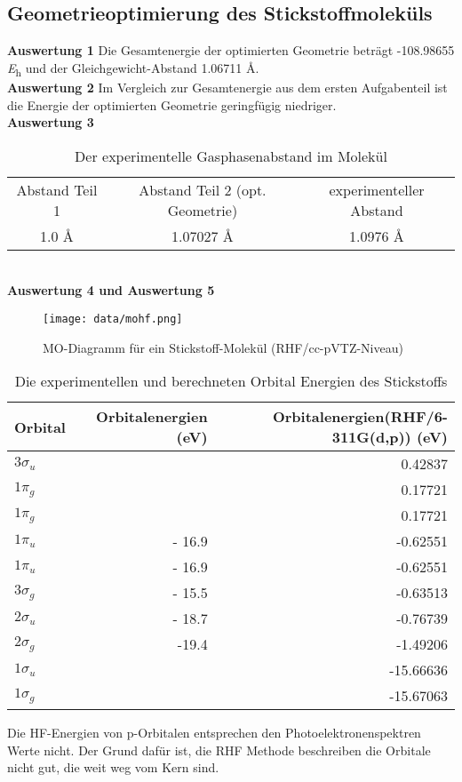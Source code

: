 \documentclass[12pt]{article}
\begin{document}
\begin{onehalfspace}
\subsection{Geometrieoptimierung des Stickstoffmoleküls}
\textbf{Auswertung 1}
Die Gesamtenergie der optimierten Geometrie beträgt -108.98655 \si{\hartree} und der Gleichgewicht-Abstand 1.06711 \si{\angstrom}.\\
\textbf{Auswertung 2}
Im Vergleich zur Gesamtenergie aus dem ersten Aufgabenteil ist die Energie der optimierten Geometrie geringfügig niedriger.\\
\textbf{Auswertung 3}\\
\begin{table}[!htpb]
\centering
\caption{Der experimentelle Gasphasenabstand im  Molekül \cite{wiberg653}}
\begin{tabular}{ccc}
\toprule
Abstand Teil 1 & Abstand Teil 2 (opt. Geometrie)  & experimenteller Abstand \\
1.0 \si{\angstrom} & 1.07027 \si{\angstrom} & 1.0976 \si{\angstrom} \\
\midrule
\bottomrule
\end{tabular}
\end{table}\\
\noindent
\textbf{Auswertung 4 und Auswertung 5}\\
\begin{figure}[!htpb]
   \centering
\texttt{[image: data/mohf.png]}
\caption{MO-Diagramm für ein Stickstoff-Molekül (RHF/cc-pVTZ-Niveau)}
\end{figure}

\begin{table}[!htpb]
\centering
\caption{Die experimentellen und berechneten Orbital Energien des Stickstoffs}
\begin{tabular}{lrr}
\toprule
Orbital & Orbitalenergien \cite{miessler} (eV) & Orbitalenergien(RHF/6-311G(d,p)) (eV)\\
\midrule
$3\sigma _u$ & &    0.42837\\
$1\pi _g$    & &    0.17721 \\
$1\pi _g$    & &    0.17721 \\
$1\pi _u$    & - 16.9 &  -0.62551 \\
$1\pi _u$    & - 16.9 & -0.62551 \\
$3\sigma _g$ &  - 15.5 & -0.63513 \\
$2\sigma _u$ & - 18.7 & -0.76739 \\
$2\sigma _g$ & -19.4  & -1.49206 \\
$1\sigma _u$ &  &-15.66636 \\
$1\sigma _g$ & &-15.67063 \\
\bottomrule
\end{tabular}
\end{table}
 Die HF-Energien von p-Orbitalen entsprechen den Photoelektronenspektren Werte \cite{miessler} nicht.
 Der Grund dafür ist, die RHF Methode beschreiben die Orbitale nicht gut, die weit weg vom Kern sind.


\end{onehalfspace}
\end{document}
